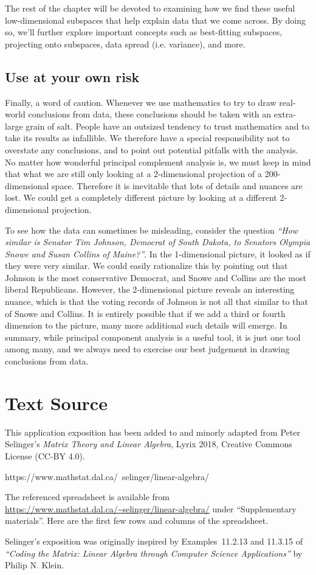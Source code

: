 \documentclass{ximera}
\begin{document}
The rest of the chapter will be devoted to examining how we find these useful low-dimensional subspaces that help explain data that we come across. By doing so, we'll further explore important concepts such as best-fitting subspaces, projecting onto subspaces, data spread (i.e. variance), and more.

\subsection*{Use at your own risk}
Finally, a word of caution. Whenever we use mathematics to try to draw
real-world conclusions from data, these conclusions should be taken
with an extra-large grain of salt. People have an outsized tendency to
trust mathematics and to take its results as infallible. We therefore
have a special responsibility not to overstate any conclusions, and to
point out potential pitfalls with the analysis. No matter how
wonderful principal complement analysis is, we must keep in mind that
what we are still only looking at a 2-dimensional projection of a
200-dimensional space. Therefore it is inevitable that lots of details
and nuances are lost. We could get a completely different picture by
looking at a different 2-dimensional projection.

To see how the data can sometimes be misleading, consider the question
{\em ``How similar is Senator Tim Johnson, Democrat of South Dakota,
  to Senators Olympia Snowe and Susan Collins of Maine?''}. In the
1-dimensional picture, it looked as if they were very similar. We
could easily rationalize this by pointing out that Johnson is the most
conservative Democrat, and Snowe and Collins are the most liberal
Republicans. However, the 2-dimensional picture reveals an interesting
nuance, which is that the voting records of Johnson is not all that
similar to that of Snowe and Collins. It is entirely possible that if
we add a third or fourth dimension to the picture, many more
additional such details will emerge. In summary, while principal
component analysis is a useful tool, it is just one tool among many,
and we always need to exercise our best judgement in drawing
conclusions from data.

\section*{Text Source}

This application exposition has been added to and minorly adapted from Peter Selinger's {\it Matrix Theory and Linear Algebra}, Lyrix 2018, Creative Commons License (CC-BY 4.0).
    
https://www.mathstat.dal.ca/~selinger/linear-algebra/

The referenced spreadsheet is available from
\url{https://www.mathstat.dal.ca/~selinger/linear-algebra/} under
``Supplementary materials''. Here are the first few rows and columns
of the spreadsheet.

Selinger's exposition was originally inspired by Examples~11.2.13
and 11.3.15 of {\em ``Coding the Matrix: Linear Algebra through
  Computer Science Applications''} by Philip N. Klein.
\end{document}
